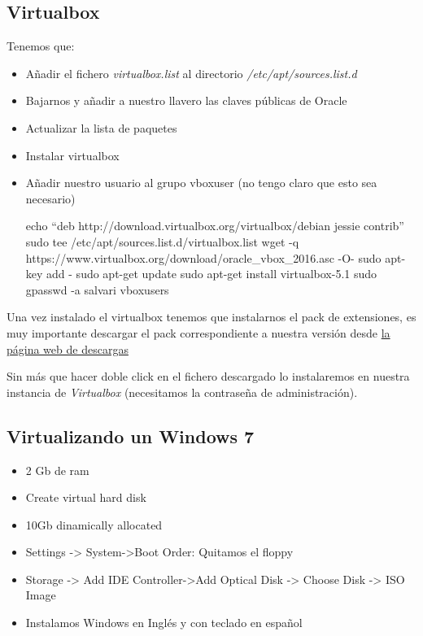 \documentclass[12pt,spanish,]{scrartcl}
\providecommand{\tightlist}{%
  \setlength{\itemsep}{0pt}\setlength{\parskip}{0pt}}
\begin{document}
\subsection{Virtualbox}\label{virtualbox}

Tenemos que:

\begin{itemize}
\item
  Añadir el fichero \emph{virtualbox.list} al directorio
  \emph{/etc/apt/sources.list.d}
\item
  Bajarnos y añadir a nuestro llavero las claves públicas de Oracle
\item
  Actualizar la lista de paquetes
\item
  Instalar virtualbox
\item
  Añadir nuestro usuario al grupo vboxuser (no tengo claro que esto sea
  necesario)

  echo ``deb http://download.virtualbox.org/virtualbox/debian jessie
  contrib'' \textbar{}sudo tee /etc/apt/sources.list.d/virtualbox.list
  wget -q https://www.virtualbox.org/download/oracle\_vbox\_2016.asc -O-
  \textbar{} sudo apt-key add - sudo apt-get update sudo apt-get install
  virtualbox-5.1 sudo gpasswd -a salvari vboxusers
\end{itemize}

Una vez instalado el virtualbox tenemos que instalarnos el pack de
extensiones, es muy importante descargar el pack correspondiente a
nuestra versión desde
\href{https://www.virtualbox.org/wiki/Downloads?}{la página web de
descargas}

Sin más que hacer doble click en el fichero descargado lo instalaremos
en nuestra instancia de \emph{Virtualbox} (necesitamos la contraseña de
administración).

\subsection{Virtualizando un Windows
7}\label{virtualizando-un-windows-7}

\begin{itemize}
\tightlist
\item
  2 Gb de ram
\item
  Create virtual hard disk
\item
  10Gb dinamically allocated
\item
  Settings -\textgreater{} System-\textgreater{}Boot Order: Quitamos el
  floppy
\item
  Storage -\textgreater{} Add IDE Controller-\textgreater{}Add Optical
  Disk -\textgreater{} Choose Disk -\textgreater{} ISO Image
\item
  Instalamos Windows en Inglés y con teclado en español
\end{itemize}
\end{document}
